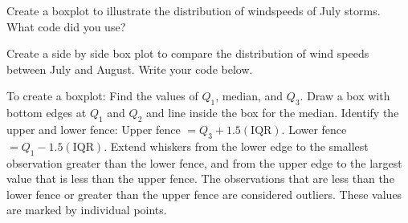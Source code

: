 \clearpage



\bb[resume]
\ii Create a boxplot to illustrate the distribution of windspeeds of July storms. What code did you use?  \vfill







\ii Create a side by side box plot to compare the distribution of wind speeds between July and August. Write your code below. \vfill







\ee

\bbox
To create a boxplot:
\bi
\ii Find the values of $Q_1$, median, and $Q_3$.
\ii Draw a box with bottom edges at $Q_1$ and $Q_2$ and line inside the box for the median.
\ii Identify the upper and lower fence:
\bi
\ii[$\circ$] Upper fence $=Q_3 + 1.5(\mbox{IQR})$.
\ii[$\circ$] Lower fence $=Q_1 - 1.5(\mbox{IQR})$.
\ei
\ii Extend whiskers from the lower edge to the smallest observation greater than the lower fence, and from the upper
edge to the largest value that is less than the upper fence.
\ii The observations that are less than the lower fence or greater than the upper fence are considered \alert{outliers}. These values are marked by individual points.
\ei
\ebox

